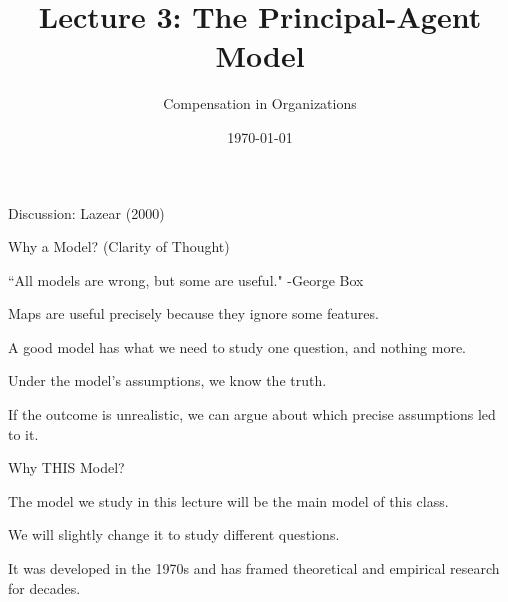 \documentclass[aspectratio=169,usenames,dvipsnames]{beamer}
\title[diss]{Lecture 3: The Principal-Agent Model} %
\author{Compensation in Organizations} %
\institute[shortinst]{Jacob Kohlhepp}
\date{\today} %
\newenvironment{wideitemize}{\itemize\addtolength{\itemsep}{10pt}}{\enditemize}
\begin{document}
\begin{frame}
\titlepage %

\end{frame}

\begin{frame}
\centering
    \huge Discussion: Lazear (2000)
\end{frame}

\begin{frame}{Why a Model? (Clarity of Thought)}

\begin{wideitemize}
    \item ``All models are wrong, but some are useful." -George Box
    \item Maps are useful precisely because they ignore some features.
    \item A good model has what we need to study one question, and nothing more.
    \item Under the model's assumptions, we know the truth.
    \item If the outcome is unrealistic, we can argue about which precise assumptions led to it.
\end{wideitemize}
    
\end{frame}

\begin{frame}{Why THIS Model?}

\begin{wideitemize}
    \item The model we study in this lecture will be the main model of this class.
    \item We will slightly change it to study different questions.
    \item It was developed in the 1970s and has framed theoretical and empirical research for decades.
\end{wideitemize}
    
\end{frame}
\end{document}
